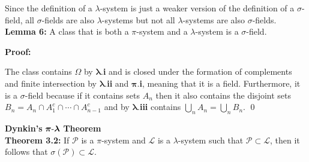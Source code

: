     \vspace{-1ex}
    Since the definition of a $\lambda$-system is just a weaker version of the definition of a $\sigma$-field, all $\sigma$-fields are also  $\lambda$-systems but not all $\lambda$-systems are also $\sigma$-fields.\\[-5pt]

    \textbf{Lemma 6: }  A class that is both a $\pi$-system and a $\lambda$-system is a $\sigma$-field.

    \textbf{Proof: }
    \vspace{-1ex}
    \begin{proofline}
        The class contains $\Omega$ by $\boldsymbol{\lambda.}$\textbf{i} and is closed under the formation of complements and finite intersection by $\boldsymbol{\lambda.}$\textbf{ii} and $\boldsymbol{\pi.}$\textbf{i}, meaning that it is a field. Furthermore, it is a $\sigma$-field because if it contains sets $A_n$ then it also contains the disjoint sets $B_n=A_n\cap A_1^c \cap \cdots \cap A_{n-1}^c$ and by $\boldsymbol{\lambda.}$\textbf{iii} contains $\bigcup_n A_n=\bigcup_n B_n$. \hfill \qed
    \end{proofline}

    \textbf{Dynkin's } $\boldsymbol{\pi{\text -}\lambda}$ \textbf{Theorem}\\
    \textbf{Theorem 3.2: }If $\mathcal{P}$ is a $\pi$-system and $\mathcal{L}$ is a $\lambda$-system such that $\mathcal{P} \subset \mathcal{L}$, then it follows that $\sigma(\mathcal{P}) \subset \mathcal{L}$.\\[-5pt]
    
